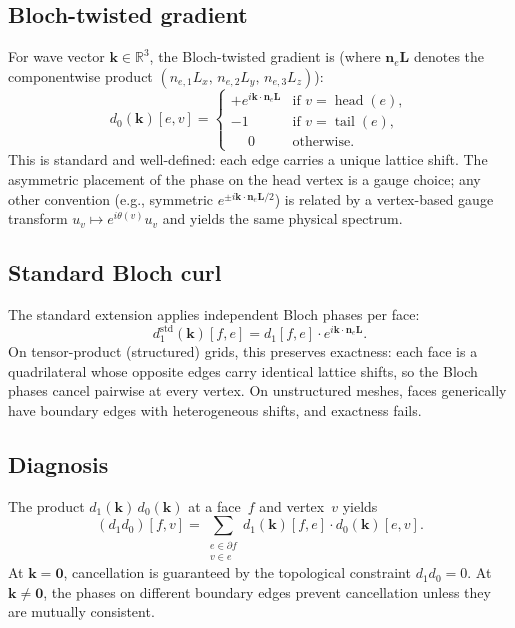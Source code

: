 \documentclass[preprint,12pt]{elsarticle}
\begin{document}
\subsection{Bloch-twisted gradient}

For wave vector $\mathbf{k} \in \mathbb{R}^3$, the Bloch-twisted gradient is (where $\mathbf{n}_e\mathbf{L}$ denotes the componentwise product $(n_{e,1}L_x,\, n_{e,2}L_y,\, n_{e,3}L_z)$):
\begin{equation}\label{eq:d0k}
  d_0(\mathbf{k})[e,v] = \begin{cases}
    +e^{i\mathbf{k}\cdot\mathbf{n}_e\mathbf{L}} & \text{if } v = \operatorname{head}(e), \\
    -1 & \text{if } v = \operatorname{tail}(e), \\
    \phantom{+}0 & \text{otherwise}.
  \end{cases}
\end{equation}
This is standard and well-defined: each edge carries a unique lattice shift. The asymmetric placement of the phase on the head vertex is a gauge choice; any other convention (e.g., symmetric $e^{\pm i\mathbf{k}\cdot\mathbf{n}_e\mathbf{L}/2}$) is related by a vertex-based gauge transform $u_v \mapsto e^{i\theta(v)}u_v$ and yields the same physical spectrum.

\subsection{Standard Bloch curl}

The standard extension applies independent Bloch phases per face:
\begin{equation}\label{eq:d1std}
  d_1^{\mathrm{std}}(\mathbf{k})[f,e] = d_1[f,e] \cdot e^{i\mathbf{k}\cdot\mathbf{n}_e\mathbf{L}}.
\end{equation}
On tensor-product (structured) grids, this preserves exactness: each face is a quadrilateral whose opposite edges carry identical lattice shifts, so the Bloch phases cancel pairwise at every vertex. On unstructured meshes, faces generically have boundary edges with heterogeneous shifts, and exactness fails.

\subsection{Diagnosis}

The product $d_1(\mathbf{k})\,d_0(\mathbf{k})$ at a face~$f$ and vertex~$v$ yields
\begin{equation}\label{eq:product}
  (d_1 d_0)[f,v] = \sum_{\substack{e \in \partial f \\ v \in e}} d_1(\mathbf{k})[f,e] \cdot d_0(\mathbf{k})[e,v].
\end{equation}
At $\mathbf{k} = \mathbf{0}$, cancellation is guaranteed by the topological constraint $d_1 d_0 = 0$. At $\mathbf{k} \neq \mathbf{0}$, the phases on different boundary edges prevent cancellation unless they are mutually consistent.
\end{document}
